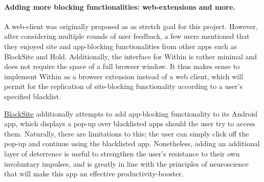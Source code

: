 \paragraph{Adding more blocking functionalities: web-extensions and more. }
A web-client was originally proposed as as stretch goal for this project. However, after considering multiple rounds of user feedback, a few users mentioned that they enjoyed site and app-blocking functionalities from other apps such as BlockSite and Hold. Additionally, the interface for Within is rather minimal and does not require the space of a full browser window. It thus makes sense to implement Within as a browser extension instead of a web client, which will permit for the replication of site-blocking functionality according to a user's specified blacklist.

\href{https://blocksite.co/}{BlockSite} additionally attempts to add app-blocking functionality to its Android app, which displays a pop-up over blacklisted apps should the user try to access them. Naturally, there are limitations to this; the user can simply click off the pop-up and continue using the blacklisted app. Nonetheless, adding an additional layer of deterrence is useful to strengthen the user's resistance to their own involuntary impulses, and is greatly in line with the principles of neuroscience that will make this app an effective productivity-booster.